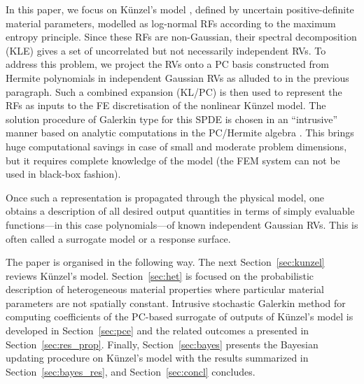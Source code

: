 \documentclass[preprint,12pt]{elsarticle}
\begin{document}
In this paper, we focus on K\"{u}nzel's model \cite{Kunzel:1995,
  Kunzel:1997}, defined by uncertain positive-definite material
parameters, modelled as log-normal RFs according to the maximum
entropy principle. Since these RFs are non-Gaussian, their spectral
decomposition (KLE) gives a set of uncorrelated but not necessarily
independent RVs.  To address this problem, we project the RVs onto a
PC basis constructed from Hermite polynomials in independent Gaussian
RVs as alluded to in the previous paragraph.  Such a combined
expansion (KL/PC) is then used to represent the RFs as inputs to the
FE discretisation of the nonlinear K\"{u}nzel model.  The solution
procedure of Galerkin type for this SPDE is chosen in an ``intrusive''
manner based on analytic computations in the PC/Hermite algebra
\cite{Matthies:2007:IB, Rosic:2011:TR, Rosic:2008:JSSCM}. This brings huge
computational savings in case of small and moderate problem
dimensions, but it requires complete knowledge of the model (the FEM
system can not be used in black-box fashion).

Once such a representation is propagated through the physical model,
one obtains a description of all desired output quantities in terms of
simply evaluable functions---in this case polynomials---of known
independent Gaussian RVs.  This is often called a surrogate model or
a response surface.

The paper is organised in the following way. The next
Section~\ref{sec:kunzel} reviews K\"unzel's model.
Section~\ref{sec:het} is focused on the probabilistic description of
heterogeneous material properties where particular material parameters
are not spatially constant. Intrusive stochastic Galerkin method for
computing coefficients of the PC-based surrogate of outputs of
K\"unzel's model is developed in Section~\ref{sec:pce} and the related
outcomes a presented in Section~\ref{sec:res_prop}.  Finally,
Section~\ref{sec:bayes} presents the Bayesian updating procedure on
K\"unzel's model with the results summarized in
Section~\ref{sec:bayes_res}, and Section~\ref{sec:concl} concludes.
\end{document}
